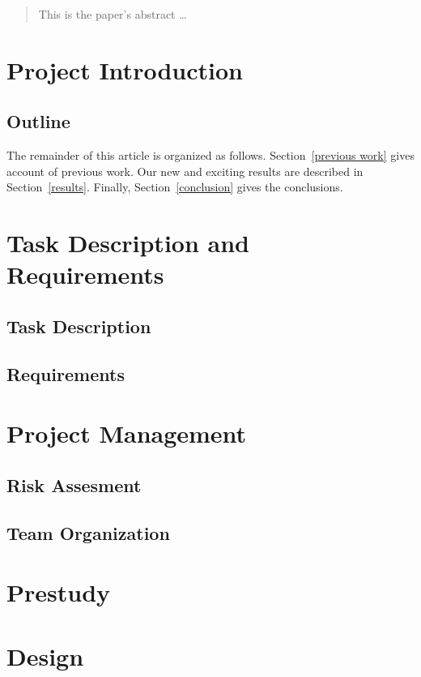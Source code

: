 \documentclass[12pt]{article}
\begin{document}
\newpage
\begin{abstract}\label{abstract}
This is the paper's abstract \ldots
\end{abstract}

\newpage
\tableofcontents
\newpage

\section{Project Introduction}\label{intoduction}
\subsection{Outline}\label{outline} 
The remainder of this article is organized as follows. Section~\ref{previous work} gives account of previous work. Our new and exciting results are described in Section~\ref{results}. Finally, Section~\ref{conclusion} gives the conclusions.

\section{Task Description and Requirements}\label{tanskreq}
\subsection{Task Description}\label{task}
\subsection{Requirements}\label{requirements}
\section{Project Management}\label{management}
\subsection{Risk Assesment}\label{risk}
\subsection{Team Organization}\label{team}
\section{Prestudy}\label{prestudy}
\section{Design}\label{design}
\end{document}
